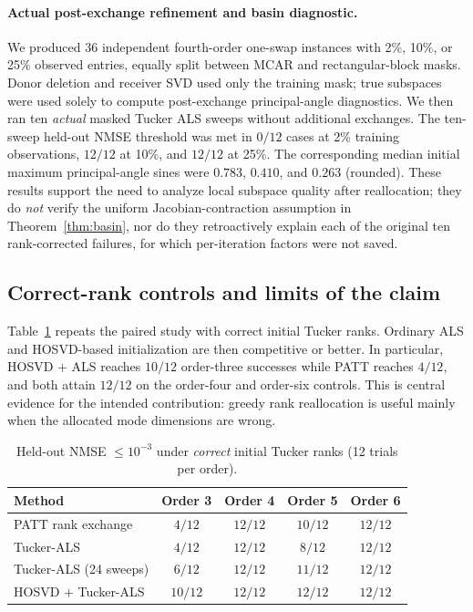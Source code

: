 \documentclass[review,10pt]{elsarticle}
\begin{document}
\paragraph{Actual post-exchange refinement and basin diagnostic.}
We produced 36 independent fourth-order one-swap instances with 2\%, 10\%, or 25\% observed entries, equally split between MCAR and rectangular-block masks. Donor deletion and receiver SVD used only the training mask; true subspaces were used solely to compute post-exchange principal-angle diagnostics. We then ran ten \emph{actual} masked Tucker ALS sweeps without additional exchanges. The ten-sweep held-out NMSE threshold was met in $0/12$ cases at 2\% training observations, $12/12$ at 10\%, and $12/12$ at 25\%. The corresponding median initial maximum principal-angle sines were $0.783$, $0.410$, and $0.263$ (rounded). These results support the need to analyze local subspace quality after reallocation; they do \emph{not} verify the uniform Jacobian-contraction assumption in Theorem~\ref{thm:basin}, nor do they retroactively explain each of the original ten rank-corrected failures, for which per-iteration factors were not saved.

\subsection{Correct-rank controls and limits of the claim}\label{subsec:correct}
Table~\ref{tab:correct} repeats the paired study with correct initial Tucker ranks. Ordinary ALS and HOSVD-based initialization are then competitive or better. In particular, HOSVD $+$ ALS reaches $10/12$ order-three successes while PATT reaches $4/12$, and both attain $12/12$ on the order-four and order-six controls. This is central evidence for the intended contribution: greedy rank reallocation is useful mainly when the allocated mode dimensions are wrong.

\begin{table}[tbp]
\caption{Held-out NMSE $\le10^{-3}$ under \emph{correct} initial Tucker ranks (12 trials per order).}\label{tab:correct}
\centering\small
\begin{tabular}{lcccc}
\toprule
Method & Order 3 & Order 4 & Order 5 & Order 6\\
\midrule
PATT rank exchange & $4/12$ & $12/12$ & $10/12$ & $12/12$\\
Tucker-ALS & $4/12$ & $12/12$ & $8/12$ & $12/12$\\
Tucker-ALS (24 sweeps) & $6/12$ & $12/12$ & $11/12$ & $12/12$\\
HOSVD $+$ Tucker-ALS & $10/12$ & $12/12$ & $12/12$ & $12/12$\\
\bottomrule
\end{tabular}
\end{table}
\end{document}
